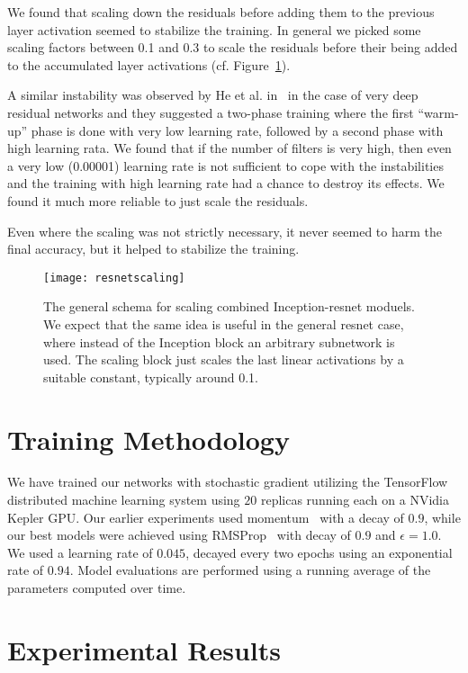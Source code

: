 \documentclass[10pt,twocolumn,letterpaper]{article}
\begin{document}
We found that scaling down the residuals before adding them to
the previous layer activation seemed to stabilize the training. In general
we picked some scaling factors between 0.1 and 0.3 to scale the residuals
before their being added to the accumulated layer activations
(cf. Figure~\ref{fig:resnetscaling}).

A similar instability was observed by He et al. in~\cite{he2015deep} in
the case of very deep residual networks and they suggested a two-phase
training where the first ``warm-up'' phase is done with very low learning
rate, followed by a second phase with high learning rata. We found that
if the number of filters is very high, then even a very low (0.00001) learning
rate is not sufficient to cope with the instabilities and the training with
high learning rate had a chance to destroy its effects. We found it much
more reliable to just scale the residuals.

Even where the scaling was not strictly necessary, it never
seemed to harm the final accuracy, but it helped to stabilize the training.
\begin{figure}
\centering
\texttt{[image: resnetscaling]}
\caption{The general schema for scaling combined Inception-resnet moduels.
  We expect that the same idea is useful in the general resnet case, where
instead of the Inception block an arbitrary subnetwork is used. The scaling
block just scales the last linear activations by a suitable constant, typically
around 0.1.}
\label{fig:resnetscaling}
\end{figure}
\section{Training Methodology}
We have trained our networks with stochastic gradient utilizing the
TensorFlow~\cite{tensorflow2015-whitepaper} distributed machine learning system
using $20$ replicas running each on a NVidia Kepler GPU.
Our earlier experiments used momentum~\cite{icml2013_sutskever13} with a
decay of $0.9$, while our best models were achieved using RMSProp~\cite{rmsprop}
with decay of $0.9$ and $\epsilon=1.0$. We used a learning rate of $0.045$,
decayed every two epochs using an exponential rate of $0.94$.
Model evaluations are performed using a running average of the parameters
computed over time.

\section{Experimental Results}
\end{document}
